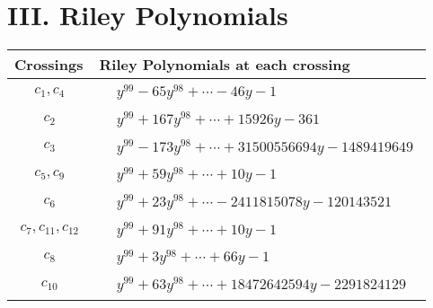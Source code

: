 \documentclass[1p]{elsarticle_modified}
\theoremstyle{definition}
\begin{document}
\centering \section*{ III. Riley Polynomials}
\begin{tabular}{m{50pt}|m{274pt}}
Crossings & \hspace{64pt}Riley Polynomials at each crossing \\
\hline $$\begin{aligned}c_{1},c_{4}\end{aligned}$$&$\begin{aligned}
&y^{99}-65 y^{98}+\cdots-46 y-1
\end{aligned}$\\
\hline $$\begin{aligned}c_{2}\end{aligned}$$&$\begin{aligned}
&y^{99}+167 y^{98}+\cdots+15926 y-361
\end{aligned}$\\
\hline $$\begin{aligned}c_{3}\end{aligned}$$&$\begin{aligned}
&y^{99}-173 y^{98}+\cdots+31500556694 y-1489419649
\end{aligned}$\\
\hline $$\begin{aligned}c_{5},c_{9}\end{aligned}$$&$\begin{aligned}
&y^{99}+59 y^{98}+\cdots+10 y-1
\end{aligned}$\\
\hline $$\begin{aligned}c_{6}\end{aligned}$$&$\begin{aligned}
&y^{99}+23 y^{98}+\cdots-2411815078 y-120143521
\end{aligned}$\\
\hline $$\begin{aligned}c_{7},c_{11},c_{12}\end{aligned}$$&$\begin{aligned}
&y^{99}+91 y^{98}+\cdots+10 y-1
\end{aligned}$\\
\hline $$\begin{aligned}c_{8}\end{aligned}$$&$\begin{aligned}
&y^{99}+3 y^{98}+\cdots+66 y-1
\end{aligned}$\\
\hline $$\begin{aligned}c_{10}\end{aligned}$$&$\begin{aligned}
&y^{99}+63 y^{98}+\cdots+18472642594 y-2291824129
\end{aligned}$\\
\hline
\end{tabular}
\vskip 2pc
\end{document}
